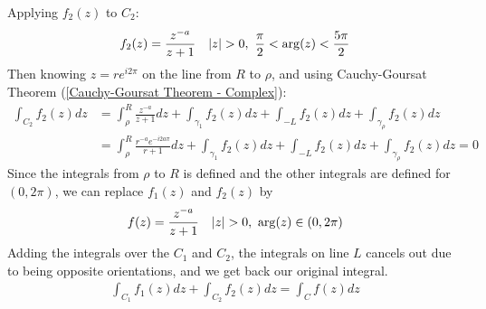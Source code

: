 \documentclass[12pt, english]{book}
\makeatletter
\renewenvironment{proof}[1][\proofname]{\par
	\pushQED{\qed}%
	\normalfont \topsep6\p@\@plus6\p@\relax
	\list{}{%
		\settowidth{\leftmargin}{\itshape\proofname:\hskip\labelsep}%
		\setlength{\labelwidth}{0pt}%
		\setlength{\itemindent}{-\leftmargin}%
		}%
	\item[\hskip\labelsep\itshape#1\@addpunct{:}]\ignorespaces
	}{\popQED\endlist\@endpefalse}
\makeatother
\begin{document}
\begin{example}
\begin{proof}
{				Applying \(f_2 (z)\) to \(C_2\):
				\begin{align*}
					f_2 (z) &= \frac{z^{-a}}{z+1}
					& \abs{z}>0, \ \frac{\pi}{2} < \arg(z) < \frac{5\pi}{2}
				\end{align*}
				Then knowing \(z = re^{i2\pi}\) on the line from \(R\) to \(\rho\), and using Cauchy-Goursat Theorem (\cref{Cauchy-Goursat Theorem - Complex}):
				\begin{align*}
					\int_{C_2} f_2 (z) dz 
					&= \int_{\rho}^{R} \frac{z^{-a}}{z+1} dz + \int_{\gamma_1} f_2 (z) dz
					+ \int_{-L} f_2 (z) dz + \int_{\gamma_\rho} f_2 (z) dz \\
					&= \int_{\rho}^{R} \frac{r^{-a}e^{-i2a\pi}}{r+1} dz + \int_{\gamma_1} f_2 (z) dz
					+ \int_{-L} f_2 (z) dz + \int_{\gamma_\rho} f_2 (z) dz 
					= 0
				\end{align*}
				Since the integrals from \(\rho\) to \(R\) is defined and the other integrals are defined for \((0,2\pi)\), we can replace \(f_1 (z)\) and \(f_2 (z)\) by
				\begin{align*}
					f(z) &= \frac{z^{-a}}{z+1}	& \abs{z}>0, \ \arg(z) \in (0, 2\pi)
				\end{align*}
				Adding the integrals over the \(C_1\) and \(C_2\), the integrals on line \(L\) cancels out due to being opposite orientations, and we get back our original integral. 
				\begin{align*}
					\int_{C_1} f_1 (z) dz + \int_{C_2} f_2 (z) dz = \int_{C} f(z) dz 
				\end{align*}
			}
		\end{proof}
		 
		\begin{figure}[H]
		 	\centering
\end{figure}
\end{example}
\end{document}
